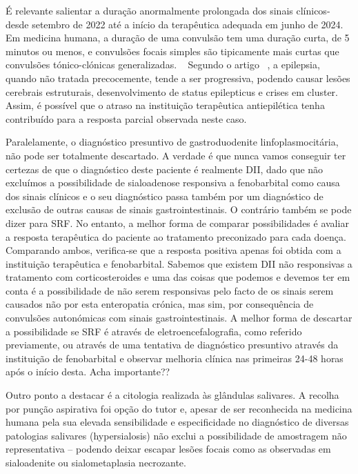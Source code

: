 É relevante salientar a duração anormalmente prolongada dos sinais clínicos-desde setembro de 2022 até a início da terapêutica adequada em junho de 2024. Em medicina humana, a duração de uma convulsão tem uma duração curta, de 5 minutos ou menos, e convulsões focais simples são tipicamente mais curtas que convulsões tónico-clónicas generalizadas. ~\cite{Diop2025}  Segundo o artigo ~\cite{Diop2025}, a epilepsia, quando não tratada precocemente, tende a ser progressiva, podendo causar lesões cerebrais estruturais, desenvolvimento de status epilepticus e crises em cluster. ~\cite{Diop2025}  Assim, é possível que o atraso na instituição terapêutica antiepilética tenha contribuído para a resposta parcial observada neste caso.


Paralelamente, o diagnóstico presuntivo de gastroduodenite linfoplasmocitária, não pode ser totalmente descartado. A verdade é que nunca vamos conseguir ter certezas de que o diagnóstico deste paciente é realmente DII, dado que não excluímos a possibilidade de sialoadenose responsiva a fenobarbital como causa dos sinais clínicos e o seu diagnóstico passa também por um diagnóstico de exclusão de outras causas de sinais gastrointestinais. O contrário também se pode dizer para SRF. No entanto, a melhor forma de comparar possibilidades é avaliar a resposta terapêutica do paciente ao tratamento preconizado para cada doença. Comparando ambos, verifica-se que a resposta positiva apenas foi obtida com a instituição terapêutica e fenobarbital. Sabemos que existem DII não responsivas a tratamento com corticosteroides e uma das coisas que podemos e devemos ter em conta é a possibilidade de não serem responsivas pelo facto de os sinais serem causados não por esta enteropatia crónica, mas sim, por consequência de convulsões autonómicas com sinais gastrointestinais. A melhor forma de descartar a possibilidade se SRF é através de eletroencefalografia, como referido previamente, ou através de uma tentativa de diagnóstico presuntivo através da instituição de fenobarbital e observar melhoria clínica nas primeiras 24-48 horas após o início desta. Acha importante??


Outro ponto a destacar é a citologia realizada às glândulas salivares. A recolha por punção aspirativa foi opção do tutor e, apesar de ser reconhecida na medicina humana pela sua elevada sensibilidade e especificidade no diagnóstico de diversas patologias salivares (hypersialosis) não exclui a possibilidade de amostragem não representativa – podendo deixar escapar lesões focais como as observadas em sialoadenite ou sialometaplasia necrozante.


